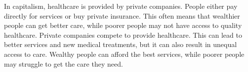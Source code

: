 \par
In capitalism, healthcare is provided by private companies. 
People either pay directly for services or buy private insurance. 
This often means that wealthier people can get better care, 
while poorer people may not have access to quality healthcare.
Private companies compete to provide healthcare. 
This can lead to better services and new medical treatments, 
but it can also result in unequal access to care. 
Wealthy people can afford the best services, 
while poorer people may struggle to get the care they need.